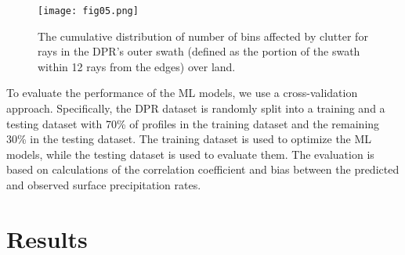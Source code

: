 \documentclass{ametsocV6.1} %
\begin{document}

\begin{center}
\begin{figure}
\texttt{[image: fig05.png]}\\
\caption{The cumulative distribution of number of bins affected by clutter for rays in the DPR's outer swath (defined as the portion of the swath within 12 rays from the edges) over land.}
\label{fig:cluttStatsLand}
\end{figure}
\end{center}


            
To evaluate the performance of the ML models, we use a cross-validation approach.  Specifically, the DPR dataset is randomly split into a training and a testing dataset with 70\% of profiles in the training dataset and the remaining 30\% in the testing dataset.  The training dataset is used to  optimize the ML models, while the testing dataset is used to evaluate them. The evaluation is based on calculations of the correlation coefficient and bias between the predicted and observed surface precipitation rates. 




\section{Results}
\end{document}
